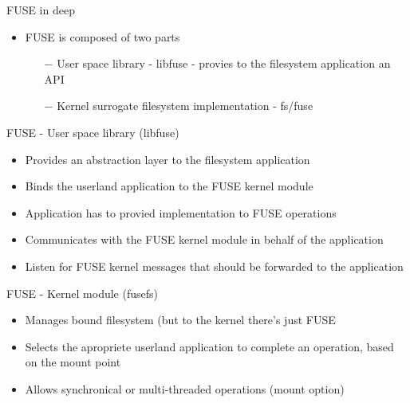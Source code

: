 \documentclass{beamer}
\begin{document}
\begin{frame}{FUSE in deep}
	
	\begin{itemize}[<+->]

		\item{FUSE is composed of two parts}
			\begin{itemize}
				\item[$-$]{User space library - libfuse - provies to the filesystem application an API}
				\item[$-$]{Kernel surrogate filesystem implementation - fs/fuse }
			\end{itemize}	
	
	\end{itemize}
	
\end{frame}

\begin{frame}{FUSE - User space library (libfuse)}
	
	\begin{itemize}[<+->]

		\item{Provides an abstraction layer to the filesystem application}		
		\item{Binds the userland application to the FUSE kernel module}
		\item{Application has to provied implementation to FUSE operations}		
		\item{Communicates with the FUSE kernel module in behalf of the application}
		\item{Listen for FUSE kernel messages that should be forwarded to the application}
			
	\end{itemize}
	
\end{frame}

\begin{frame}{FUSE - Kernel module (fusefs)}
	
	\begin{itemize}[<+->]

		\item{Manages bound filesystem (but to the kernel there's just FUSE}
		\item{Selects the apropriete userland application to complete an operation, based on the mount point}
		\item{Allows synchronical or multi-threaded operations (mount option)}

	\end{itemize}
	
\end{frame}
\end{document}

